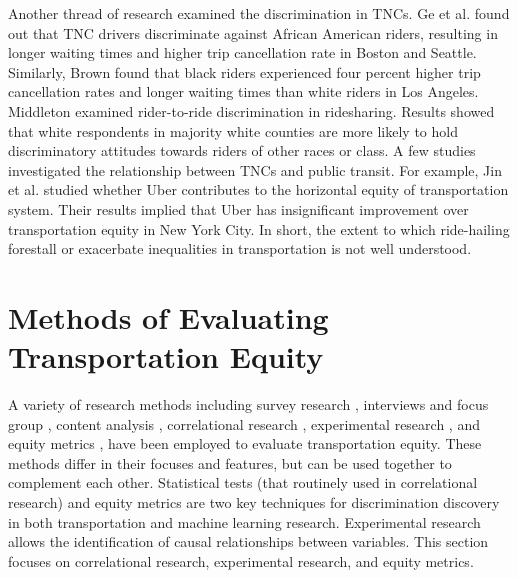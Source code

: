 \documentclass[11pt]{article}
\begin{document}
Another thread of research examined the discrimination in TNCs. Ge et al. \cite{ge2016racial} found out that TNC drivers discriminate against African American riders, resulting in longer waiting times and higher trip cancellation rate in Boston and Seattle. Similarly, Brown \cite{brown2018ridehail} found that black riders experienced four percent higher trip cancellation rates and longer waiting times than white riders in Los Angeles. Middleton \cite{middleton2018discrimination} examined rider-to-ride discrimination in ridesharing. Results showed that white respondents in majority white counties are more likely to hold discriminatory attitudes towards riders of other races or class.  A few studies investigated the relationship between TNCs and public transit. For example, Jin et al. \cite{jin2019uber} studied whether Uber contributes to the horizontal equity of transportation system. Their results implied that Uber has insignificant improvement over transportation equity in New York City. In short, the extent to which ride-hailing forestall or exacerbate inequalities in transportation is not well understood. 


\section{Methods of Evaluating Transportation Equity}

A variety of research methods including survey research \cite{mcneil2017breaking}, interviews and focus group \cite{kretman2011bringing}, content analysis \cite{manaugh2015integrating}, correlational research \cite{hughes2016transportation, wang2018spatial, daddio2012maximizing, rixey2013station, ogilvie2012inequalities}, experimental research \cite{ge2016racial, brown2018ridehail}, and equity metrics \cite{delbosc2011using,jin2019uber, meng2018evaluation}, have been employed to evaluate transportation equity. These methods differ in their focuses and features, but can be used together to complement each other. Statistical tests (that routinely used in correlational research) and equity metrics are two key techniques for discrimination discovery in both transportation and machine learning research. Experimental research allows the identification of causal relationships between variables. This section focuses on correlational research, experimental research, and equity metrics. 
\end{document}
